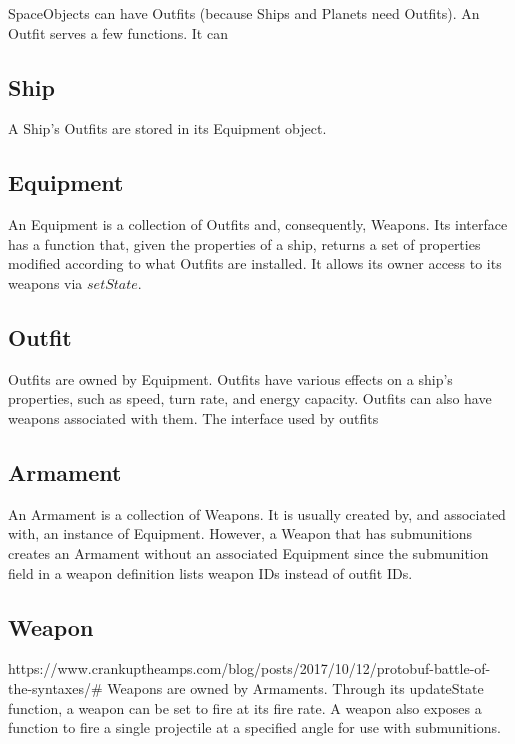 \documentclass{article}
\begin{document}
SpaceObjects can have Outfits (because Ships and Planets need Outfits). An Outfit serves a few functions. It can 

\subsection{Ship}
A Ship's Outfits are stored in its Equipment object.

\subsection{Equipment}
An Equipment is a collection of Outfits and, consequently, Weapons. Its interface has a function that, given the properties of a ship, returns a set of properties modified according to what Outfits are installed. It allows its owner access to its weapons via $setState$.

\subsection{Outfit}
Outfits are owned by Equipment. Outfits have various effects on a ship's properties, such as speed, turn rate, and energy capacity. Outfits can also have weapons associated with them. The interface used by outfits

\subsection{Armament}
An Armament is a collection of Weapons. It is usually created by, and associated with, an instance of Equipment. However, a Weapon that has submunitions creates an Armament without an associated Equipment since the submunition field in a weapon definition lists weapon IDs instead of outfit IDs.

\subsection{Weapon}
https://www.crankuptheamps.com/blog/posts/2017/10/12/protobuf-battle-of-the-syntaxes/# Weapons are owned by Armaments. Through its updateState function, a weapon can be set to fire at its fire rate. A weapon also exposes a function to fire a single projectile at a specified angle for use with submunitions.
\end{document}

